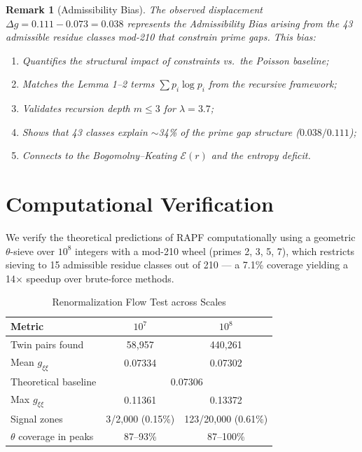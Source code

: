\documentclass[12pt]{article}
\newtheorem{remark}[theorem]{Remark}
\begin{document}
\begin{remark}[Admissibility Bias]
The observed displacement $\Delta g = 0.111 - 0.073 = 0.038$ represents the
Admissibility Bias arising from the 43 admissible residue classes mod-210 that
constrain prime gaps. This bias:
\begin{enumerate}
  \item Quantifies the structural impact of constraints vs.\ the Poisson baseline;
  \item Matches the Lemma 1--2 terms $\sum p_i \log p_i$ from the recursive framework;
  \item Validates recursion depth $m \leq 3$ for $\lambda = 3.7$;
  \item Shows that 43 classes explain $\sim$34\% of the prime gap structure ($0.038/0.111$);
  \item Connects to the Bogomolny--Keating $\mathcal{E}(r)$ and the entropy deficit.
\end{enumerate}
\end{remark}

\section{Computational Verification}

We verify the theoretical predictions of RAPF computationally using a geometric
$\theta$-sieve over $10^8$ integers with a mod-210 wheel (primes 2, 3, 5, 7),
which restricts sieving to 15 admissible residue classes out of 210 --- a
7.1\% coverage yielding a 14$\times$ speedup over brute-force methods.

\begin{table}[htbp]
\centering
\caption{Renormalization Flow Test across Scales}
\label{tab:renormalization}
\begin{tabular}{lcc}
\hline
\textbf{Metric} & \textbf{$10^7$} & \textbf{$10^8$} \\
\hline
Twin pairs found & 58,957 & 440,261 \\
Mean $g_{\xi\xi}$ & 0.07334 & 0.07302 \\
Theoretical baseline & \multicolumn{2}{c}{0.07306} \\
Max $g_{\xi\xi}$ & 0.11361 & 0.13372 \\
Signal zones & 3/2,000 (0.15\%) & 123/20,000 (0.61\%) \\
$\theta$ coverage in peaks & 87--93\% & 87--100\% \\
\hline
\end{tabular}
\end{table}
\end{document}
